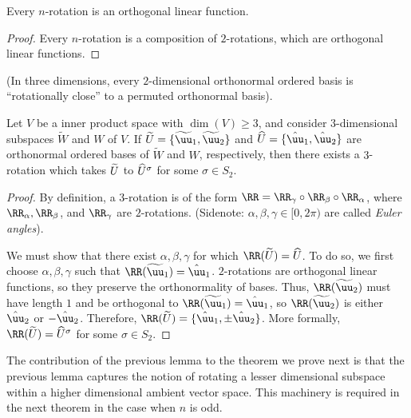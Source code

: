 \begin{theorem}
\label{ch::exterior_pwrs::thm::n_dim_rot_det_1}
    Every $n$-rotation is an orthogonal linear function.
\end{theorem}

\begin{proof}
    Every $n$-rotation is a composition of $2$-rotations, which are orthogonal linear functions.
\end{proof}

\begin{lemma}
\label{ch::exterior_pwrs::thm::3_rot_acts_on_subspaces}
    (In three dimensions, every $2$-dimensional orthonormal ordered basis is ``rotationally close'' to a permuted orthonormal basis).
    
    Let $V$ be a inner product space with $\dim(V) \geq 3$, and consider $3$-dimensional subspaces $\widetilde{W}$ and $W$ of $V$. If $\tU = \{ \tuu_1, \tuu_2 \}$ and $\hU = \{ \huu_1, \huu_2 \}$ are orthonormal ordered bases of $\widetilde{W}$ and $W$, respectively, then there exists a $3$-rotation which takes $\widetilde{U}$ to $\widehat{U}^\sigma$ for some $\sigma \in S_2$.
\end{lemma}

\begin{proof}
   By definition, a $3$-rotation is of the form $\RR = \RR_\gamma \circ \RR_\beta \circ \RR_\alpha$, where $\RR_\alpha, \RR_\beta$, and $\RR_\gamma$ are $2$-rotations. (Sidenote: $\alpha, \beta, \gamma \in [0, 2\pi)$ are called \textit{Euler angles}).
   
   We must show that there exist $\alpha, \beta, \gamma$ for which $\RR(\tU) = \hU$. To do so, we first choose $\alpha, \beta, \gamma$ such that $\RR(\tuu_1) = \huu_1$. $2$-rotations are orthogonal linear functions, so they preserve the orthonormality of bases. Thus, $\RR(\tuu_2)$ must have length $1$ and be orthogonal to $\RR(\tuu_1) = \huu_1$, so $\RR(\tuu_2)$ is either $\huu_2$ or $-\huu_2$. Therefore, $\RR(\tU) = \{\huu_1, \pm \huu_2 \}$. More formally, $\RR(\tU) =\hU^\sigma$ for some $\sigma \in S_2$.
   
\end{proof}

\begin{remark}
    The contribution of the previous lemma to the theorem we prove next is that the previous lemma captures the notion of rotating a lesser dimensional subspace within a higher dimensional ambient vector space. This machinery is required in the next theorem in the case when $n$ is odd.
\end{remark}

